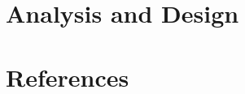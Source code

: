\documentclass[12pt,final,oneside]{fithesis2}
\begin{document}
\chapter{Analysis and Design}
%
%







\begingroup
\def\tmpchapter{0}
\renewcommand{\chaptername}{}
\renewcommand{\thechapter}{}
\chapter{References}
\renewcommand{\chapter}[2]{}%
\end{document}
